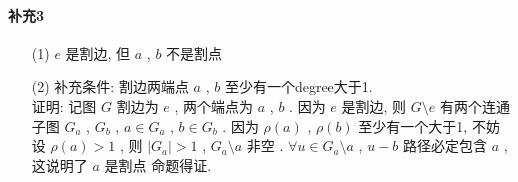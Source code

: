 \documentclass[a4paper, UTF8]{ctexart}				%
\numberwithin{equation}{section}				%
\begin{document}
    \paragraph{补充3}
        \begin{itemize}
            \item[(1)] $e$ 是割边, 但 $a$ , $b$ 不是割点
            \item[(2)] 
            补充条件: 割边两端点 $a$ , $b$ 至少有一个degree大于1.\\
            证明: 记图 $G$ 割边为 $e$ , 两个端点为 $a$ , $b$ . 因为 $e$ 是割边, 则 $G \setminus e$ 有两个连通子图 $G_a$ , $G_b$ , $a \in G_a$ , $b \in G_b$ . 因为 $\rho(a)$ , $\rho(b)$ 至少有一个大于1, 不妨设 $\rho(a) > 1$ , 则 $\vert{G_a}\vert > 1$ , $G_a \setminus a$ 非空 . $\forall u \in G_a \setminus a$ , $u-b$ 路径必定包含 $a$ , 这说明了 $a$ 是割点 命题得证.
        \end{itemize}
\end{document}
